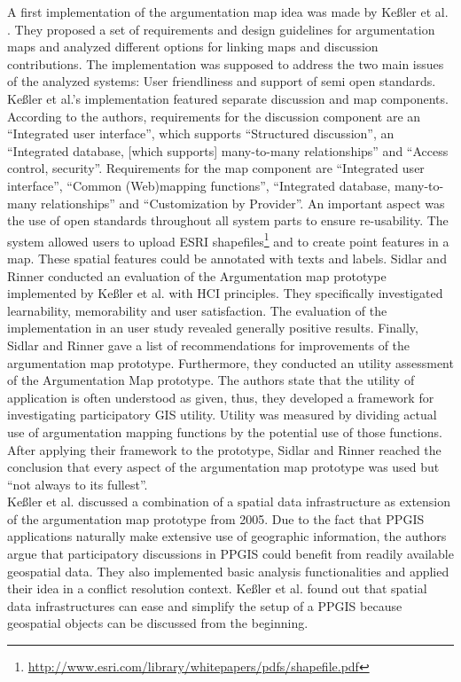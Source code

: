 A first implementation of the argumentation map idea was made by Ke{\ss}ler et al. \cite{Kessler2005_ArgumentationMapPrototype}. They proposed a set of requirements and design guidelines for argumentation maps and analyzed different options for linking maps and discussion contributions. The implementation was supposed to address the two main issues of the analyzed systems: User friendliness and support of semi open standards. Ke{\ss}ler et al.'s implementation featured separate discussion and map components. According to the authors, requirements for the discussion component are an ``Integrated user interface'', which supports ``Structured discussion'', an ``Integrated database, [which supports] many-to-many relationships'' and ``Access control, security''. Requirements for the map component are ``Integrated user interface'', ``Common (Web)mapping functions'', ``Integrated database, many-to-many relationships'' and ``Customization by Provider''. An important aspect was the use of open standards throughout all system parts to ensure re-usability. The system allowed users to upload ESRI shapefiles\footnote{\url{http://www.esri.com/library/whitepapers/pdfs/shapefile.pdf}} and to create point features in a map. These spatial features could be annotated with texts and labels. Sidlar and Rinner \cite{sidlar_argumap_2007} conducted an evaluation of the Argumentation map prototype implemented by Ke{\ss}ler et al. with HCI principles. They specifically investigated learnability, memorability and user satisfaction. The evaluation of the implementation in an user study revealed generally positive results. Finally, Sidlar and Rinner gave a list of recommendations for improvements of the argumentation map prototype. Furthermore, they conducted an utility assessment \cite{Sidlar2009-AssessmentMapGeocollaborationTool} of the Argumentation Map prototype. The authors state that the utility of application is often understood as given, thus, they developed a framework for investigating participatory GIS utility. Utility was measured by dividing actual use of argumentation mapping functions by the potential use of those functions. After applying their framework to the prototype, Sidlar and Rinner reached the conclusion that every aspect of the argumentation map prototype was used but ``not always to its fullest''.\\
Ke{\ss}ler et al. \cite{Kessler2005_Conflict_Resolution} discussed a combination of a spatial data infrastructure as extension of the argumentation map prototype from 2005. Due to the fact that PPGIS applications naturally make extensive use of geographic information, the authors argue that participatory discussions in PPGIS could benefit from readily available geospatial data. They also implemented basic analysis functionalities and applied their idea in a conflict resolution context. Ke{\ss}ler et al. found out that spatial data infrastructures can ease and simplify the setup of a PPGIS because geospatial objects can be discussed from the beginning.\\
